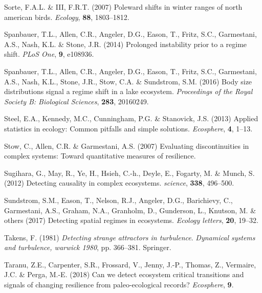 \documentclass[print]{nuthesis}
\begin{document}
\leavevmode\hypertarget{ref-sorte2007poleward}{}%
Sorte, F.A.L. \& III, F.R.T. (2007) Poleward shifts in winter ranges of north american birds. \emph{Ecology}, \textbf{88}, 1803--1812.

\leavevmode\hypertarget{ref-spanbauer_prolonged_2014}{}%
Spanbauer, T.L., Allen, C.R., Angeler, D.G., Eason, T., Fritz, S.C., Garmestani, A.S., Nash, K.L. \& Stone, J.R. (2014) Prolonged instability prior to a regime shift. \emph{PLoS One}, \textbf{9}, e108936.

\leavevmode\hypertarget{ref-spanbauer2016body}{}%
Spanbauer, T.L., Allen, C.R., Angeler, D.G., Eason, T., Fritz, S.C., Garmestani, A.S., Nash, K.L., Stone, J.R., Stow, C.A. \& Sundstrom, S.M. (2016) Body size distributions signal a regime shift in a lake ecosystem. \emph{Proceedings of the Royal Society B: Biological Sciences}, \textbf{283}, 20160249.

\leavevmode\hypertarget{ref-steel2013applied}{}%
Steel, E.A., Kennedy, M.C., Cunningham, P.G. \& Stanovick, J.S. (2013) Applied statistics in ecology: Common pitfalls and simple solutions. \emph{Ecosphere}, \textbf{4}, 1--13.

\leavevmode\hypertarget{ref-stow2007evaluating}{}%
Stow, C., Allen, C.R. \& Garmestani, A.S. (2007) Evaluating discontinuities in complex systems: Toward quantitative measures of resilience.

\leavevmode\hypertarget{ref-sugihara2012detecting}{}%
Sugihara, G., May, R., Ye, H., Hsieh, C.-h., Deyle, E., Fogarty, M. \& Munch, S. (2012) Detecting causality in complex ecosystems. \emph{science}, \textbf{338}, 496--500.

\leavevmode\hypertarget{ref-sundstrom2017detecting}{}%
Sundstrom, S.M., Eason, T., Nelson, R.J., Angeler, D.G., Barichievy, C., Garmestani, A.S., Graham, N.A., Granholm, D., Gunderson, L., Knutson, M. \& others (2017) Detecting spatial regimes in ecosystems. \emph{Ecology letters}, \textbf{20}, 19--32.

\leavevmode\hypertarget{ref-takens1981detecting}{}%
Takens, F. (1981) \emph{Detecting strange attractors in turbulence}. \emph{Dynamical systems and turbulence, warwick 1980}, pp. 366--381. Springer.

\leavevmode\hypertarget{ref-taranu2018can}{}%
Taranu, Z.E., Carpenter, S.R., Frossard, V., Jenny, J.-P., Thomas, Z., Vermaire, J.C. \& Perga, M.-E. (2018) Can we detect ecosystem critical transitions and signals of changing resilience from paleo-ecological records? \emph{Ecosphere}, \textbf{9}.
\end{document}
